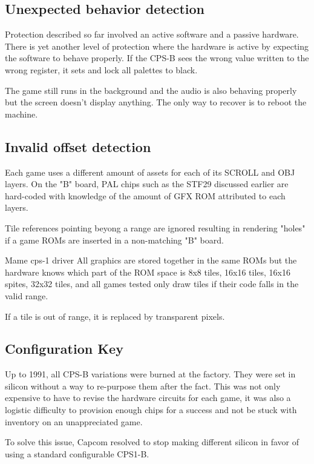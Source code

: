 \subsection{Unexpected behavior detection}
Protection described so far involved an active software and a passive hardware. There is yet another level of protection where the hardware is active by expecting the software to behave properly. If the CPS-B sees the wrong value written to the wrong register, it sets and lock all palettes to black. 

The game still runs in the background and the audio is also behaving properly but the screen doesn't display anything. The only way to recover is to reboot the machine\cite{petitSecurity}.

\subsection{Invalid offset detection}

Each game uses a different amount of assets for each of its SCROLL and OBJ layers. On the "B" board, PAL chips such as the STF29 discussed earlier are hard-coded with knowledge of the amount of GFX ROM attributed to each layers.

Tile references pointing beyong a range are ignored resulting in rendering "holes" if a game ROMs are inserted in a non-matching "B" board.

\begin{q}{Mame cps-1 driver}
All graphics are
stored together in the same ROMs but the hardware knows which part of the ROM space
is 8x8 tiles, 16x16 tiles, 16x16 spites, 32x32 tiles, and all games tested only
draw tiles if their code falls in the valid range. 

If a tile is out of range, it is replaced by transparent pixels.
\end{q}

\subsection{Configuration Key}
Up to 1991, all CPS-B variations were burned at the factory. They were set in silicon without a way to re-purpose them after the fact. This was not only expensive to have to revise the hardware circuits for each game, it was also a logistic difficulty to provision enough chips for a success and not be stuck with inventory on an unappreciated game.

To solve this issue, Capcom resolved to stop making different silicon in favor of using a standard configurable CPS1-B.


